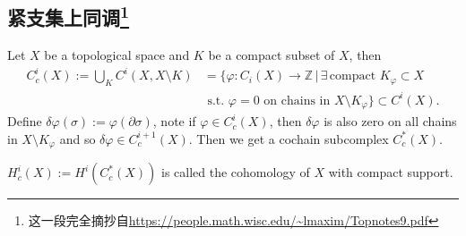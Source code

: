 
    \subsection[紧支集上同调]{紧支集上同调\footnote{这一段完全摘抄自\url{https://people.math.wisc.edu/~lmaxim/Topnotes9.pdf}}}
    Let \( X \) be a topological space and \( K \) be a compact subset of \( X \), then
    \begin{align*}
        C_c^i(X) := \bigcup_K C^i(X, X \setminus K) &= \Big\{\varphi : C_i(X) \to \mathbb{Z} \, \big| \, \exists \, \text{compact } K_\varphi \subset X \\
        &\text{ s.t. } \varphi = 0 \text{ on chains in } X \setminus K_\varphi\Big\} \subset C^i(X).
    \end{align*}
    Define \( \delta \varphi(\sigma) := \varphi(\partial\sigma) \), note if \( \varphi \in C_c^i(X) \), then \( \delta \varphi \) is also zero on all chains in \( X \setminus K_\varphi \) and so \( \delta \varphi \in C_c^{i+1}(X) \). Then we get a cochain subcomplex \( C_c^*(X) \).
    \begin{definition}
        $H_c^i(X) := H^i(C_c^*(X))$ is called the cohomology of $X$ with compact support.
    \end{definition}
    

